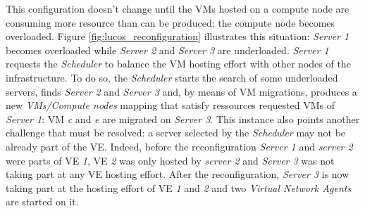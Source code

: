 \newpage

This configuration doesn't change until the VMs hosted on a compute node are
consuming more resource than can be produced: the compute node becomes 
overloaded. Figure \ref{fig:lucos_reconfiguration} illustrates this situation: 
\emph{Server 1} becomes overloaded while \emph{Server 2} and \emph{Server 3} are
underloaded. \emph{Server 1} requests the \emph{Scheduler} to balance the VM hosting effort 
with other nodes of the infrastructure. To do so, the \emph{Scheduler} starts 
the search of some underloaded servers, finds \emph{Server 2} and 
\emph{Server 3} and, by means of VM migrations, produces a new 
\emph{VMs/Compute nodes} mapping that satisfy ressources requested VMs of
\emph{Server 1}: VM \emph{c} and \emph{e} are migrated on \emph{Server 3}. This
instance also points another challenge that must be resolved: a server selected 
by the \emph{Scheduler} may not be already part of the VE. Indeed, before the 
reconfiguration \emph{Server 1} and \emph{server 2} were parts of VE \emph{1},
VE \emph{2} was only hosted by \emph{server 2} and \emph{Server 3} was not 
taking part at any VE hosting effort. After the reconfiguration, \emph{Server 3} 
is now taking part at the hosting effort of VE \emph{1} and \emph{2} and two 
\emph{Virtual Network Agents} are started on it.









